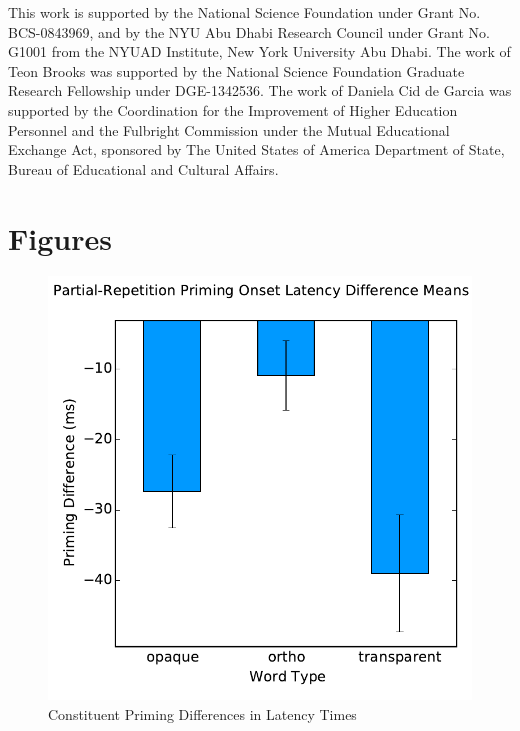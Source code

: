 \documentclass{frontiersSCNS}
\begin{document}
This work is supported by the National Science Foundation under Grant No. BCS-0843969, and by the NYU Abu Dhabi Research Council under Grant No. G1001 from the NYUAD Institute, New York University Abu Dhabi.  The work of Teon Brooks was supported by the National Science Foundation Graduate Research Fellowship under DGE-1342536. The work of Daniela Cid de Garcia was supported by the Coordination for the Improvement of Higher Education Personnel and the Fulbright Commission under the Mutual Educational Exchange Act, sponsored by The United States of
America Department of State, Bureau of Educational and Cultural Affairs.



\section*{Figures}

\begin{figure}
\begin{centering}
\includegraphics[scale=0.75]{images/latency_constituent_analysis}
\par\end{centering}
\caption{\label{fig:latency} Constituent Priming Differences in Latency Times}
\end{figure}
\end{document}
